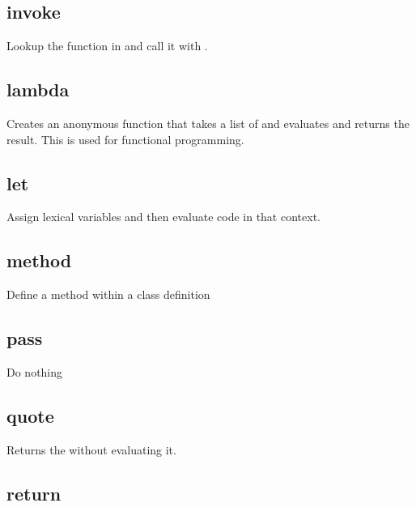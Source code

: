 \begin{itemize}
\subsection{invoke}
  \par

  Lookup the function in  and call it with .

\subsection{lambda}

  Creates an anonymous function that takes a list of  and evaluates  and returns the result.
  This is used for functional programming.

\subsection{let}

  Assign lexical variables and then evaluate code in that context.

\subsection{method}
  \par

  Define a method within a class definition

\subsection{pass}
  \par

  Do nothing

\subsection{quote}

  Returns the  without evaluating it.

\subsection{return}


\end{itemize}
